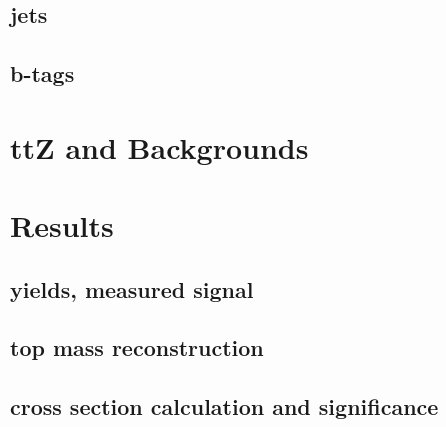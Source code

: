 \documentclass[12pt,chapterheads,oneside]{ucsd}
\begin{document}
	\section{jets}
	\section{b-tags}


\chapter{ttZ and Backgrounds}
	
	



	









\chapter{Results}
	\section{yields, measured signal}
	\section{top mass reconstruction}
	\section{cross section calculation and significance}
   






\appendix
\end{document}
